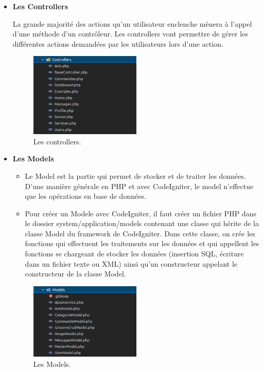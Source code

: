 \documentclass[french]{report}
\begin{document}
\begin{itemize}
            \item \textbf{Les Controllers}
            
            La grande majorité des actions qu'un utilisateur enclenche mènera à l'appel
	    d'une méthode d'un contrôleur. Les controllers vont permettre de gérer les
	    différentes actions demandées par les utilisateurs lors d'une action.
            
            \begin{figure}[H]
                \centering
                \includegraphics[width=0.5\textwidth]{images/controlers.png}
                \caption{Les controllers.}
                \label{CI Controllers}
            \end{figure}
            
            \item \textbf{Les Models}
            \begin{itemize}
                \item  Le Model est la partie qui permet de stocker et de traiter les données.
		D'une manière générale en PHP et avec CodeIgniter, le model n'effectue que les
		opérations en base de données. 
                \item Pour créer un Modele avec CodeIgniter, il faut créer un fichier PHP dans
		le dossier system/application/models contenant une classe qui hérite de la
		classe Model du framework de CodeIgniter. Dans cette classe, on crée les 
		fonctions qui effectuent les traitements sur les données et qui appellent
		les fonctions se chargeant de stocker les données (insertion SQL, écriture
		dans un fichier texte ou XML) ainsi qu'un constructeur appelant le constructeur de la classe Model.
    
            \end{itemize}
              \begin{figure}[H]
                \centering
                \includegraphics[width=0.5\textwidth]{images/models.png}
                \caption{Les Models.}
                \label{fig:my_label}
            \end{figure}
            

\end{itemize}
\end{document}
